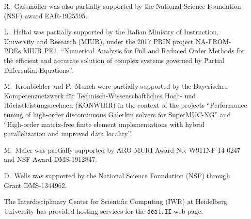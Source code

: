 \documentclass{ansarticle-preprint}
\newcommand{\specialword}[1]{\texttt{#1}}
\newcommand{\dealii}{{\specialword{deal.II}}\xspace}
\begin{document}
R.~Gassm{\"o}ller was also partially supported by the National Science
Foundation (NSF) award EAR-1925595.

L.~Heltai was partially supported by the Italian Ministry of Instruction,
University and Research (MIUR), under the 2017 PRIN project NA-FROM-PDEs MIUR
PE1, ``Numerical Analysis for Full and Reduced Order Methods for the efficient
and accurate solution of complex systems governed by Partial Differential
Equations''.

M.~Kronbichler and P.~Munch were partially supported by the
Bayerisches Kompetenznetzwerk
f\"ur Technisch-Wissen\-schaft\-li\-ches Hoch- und H\"ochstleistungsrechnen
(KONWIHR) in the context of the projects
``Performance tuning of high-order discontinuous Galerkin solvers for
SuperMUC-NG'' and ``High-order matrix-free finite element implementations with
hybrid parallelization and improved data locality''.

M.~Maier was partially supported by ARO MURI Award No. W911NF-14-0247 and
NSF Award DMS-1912847.

D.~Wells was supported by the National Science Foundation (NSF) through Grant
DMS-1344962.

The Interdisciplinary Center for Scientific Computing (IWR) at Heidelberg
University has provided hosting services for the \dealii{} web page.


{}

\end{document}
